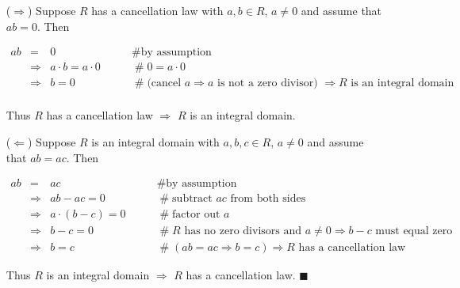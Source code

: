 \documentclass{article}
\theoremstyle{definition}
\begin{document}
\begin{itemize}
\item [($\Rightarrow$)] Suppose $R$ has a cancellation law 
with $a,b \in R$, $a \neq 0$ and assume that $ab = 0$. Then

\vspace{-0.25cm}															%
\begin{equation*}
\begin{array}{rcll} 
ab
&=& 0 								
			&\hspace{2em} \mathrel{\#} \text{by assumption} \\
[5pt]
&\Rightarrow& a \cdot b = a \cdot 0 
			&\hspace{2em} \mathrel{\#} 0 = a \cdot 0 \\
[5pt]
&\Rightarrow& b = 0 				
			&\hspace{2em} \mathrel{\#} \text{(cancel 
			$a \Rightarrow a$ is not a zero divisor) 
			$\Rightarrow R$ is an integral domain} \\
\end{array}
\end{equation*}

\medskip
\noindent
Thus $R$ has a cancellation law $\Rightarrow$ $R$ is an integral 
domain.

\medskip
\noindent
\item [($\Leftarrow$)] Suppose $R$ is an integral domain with $a,b,c \in R$, 
$a \neq 0$ and assume that $ab = ac$. Then 

\begin{equation*}
\begin{array}{rcll} 
ab
&=& ac                                                  
			&\hspace{2em} \mathrel{\#} \text{by assumption} \\
[5pt]
&\Rightarrow& ab-ac = 0
			&\hspace{2em} \mathrel{\#} \text{subtract $ac$ from both sides} \\
[5pt]
&\Rightarrow& a\cdot(b-c) = 0
			&\hspace{2em} \mathrel{\#} \text{factor out $a$} \\
[5pt]
&\Rightarrow& b-c = 0
			&\hspace{2em} \mathrel{\#} \text{$R$ has no zero divisors and 
				$a \neq 0 \Rightarrow b-c$ must equal zero} \\
[5pt]
&\Rightarrow& b = c 
			&\hspace{2em} \mathrel{\#} \text{$(ab=ac \Rightarrow b = c)
			\Rightarrow R$ has a cancellation law}
\end{array}
\end{equation*}

\medskip
\noindent
Thus $R$ is an integral domain $\Rightarrow$ $R$ has a cancellation 
law. $\blacksquare$
\end{itemize}
\end{document}
